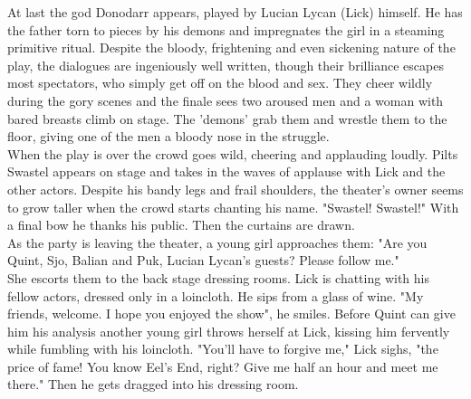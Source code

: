 At last the god Donodarr appears, played by Lucian Lycan (Lick) himself. He has the father torn to pieces by his demons and impregnates the girl in a steaming primitive ritual. Despite the bloody, frightening and even sickening nature of the play, the dialogues are ingeniously well written, though their brilliance escapes most spectators, who simply get off on the blood and sex. They cheer wildly during the gory scenes and the finale sees two aroused men and a woman with bared breasts climb on stage. The 'demons' grab them and wrestle them to the floor, giving one of the men a bloody nose in the struggle.\\

When the play is over the crowd goes wild, cheering and applauding loudly. Pilts Swastel appears on stage and takes in the waves of applause with Lick and the other actors. Despite his bandy legs and frail shoulders, the theater's owner seems to grow taller when the crowd starts chanting his name. "Swastel! Swastel!" With a final bow he thanks his public. Then the curtains are drawn.\\

As the party is leaving the theater, a young girl approaches them: "Are you Quint, Sjo, Balian and Puk, Lucian Lycan's guests? Please follow me."\\

She escorts them to the back stage dressing rooms. Lick is chatting with his fellow actors, dressed only in a loincloth. He sips from a glass of wine. "My friends, welcome. I hope you enjoyed the show", he smiles. Before Quint can give him his analysis another young girl throws herself at Lick, kissing him fervently while fumbling with his loincloth. "You'll have to forgive me," Lick sighs, "the price of fame! You know Eel's End, right? Give me half an hour and meet me there." Then he gets dragged into his dressing room.\\

